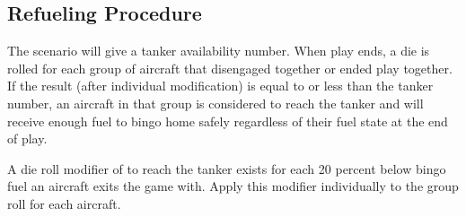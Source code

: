 \subsection{Refueling Procedure} The scenario will give a tanker availability number. When play ends, a die is rolled for each group of aircraft that disengaged together or ended play together. If the result (after individual modification) is equal to or less than the tanker number, an aircraft in that group is considered to reach the tanker and will receive enough fuel to bingo home safely regardless of their fuel state at the end of play.

A die roll modifier of  to reach the tanker exists for each 20 percent below bingo fuel an aircraft exits the game with. Apply this modifier individually to the group roll for each aircraft.
